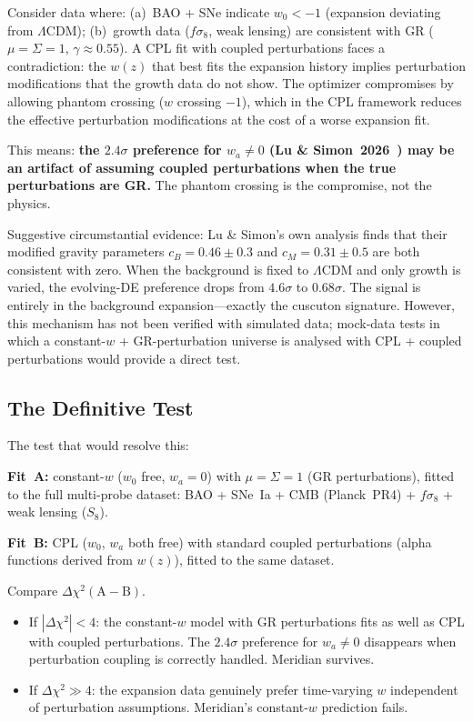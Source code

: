 Consider data where: (a)~BAO + SNe indicate $w_0 < -1$ (expansion deviating from $\Lambda$CDM); (b)~growth data ($f\sigma_8$, weak lensing) are consistent with GR ($\mu = \Sigma = 1$, $\gamma \approx 0.55$). A CPL fit with coupled perturbations faces a contradiction: the $w(z)$ that best fits the expansion history implies perturbation modifications that the growth data do not show. The optimizer compromises by allowing phantom crossing ($w$ crossing $-1$), which in the CPL framework reduces the effective perturbation modifications at the cost of a worse expansion fit.

This means: \textbf{the $2.4\sigma$ preference for $w_a \neq 0$ (Lu \& Simon~2026~\cite{ch2:LuSimon2026}) may be an artifact of assuming coupled perturbations when the true perturbations are GR.} The phantom crossing is the compromise, not the physics.

Suggestive circumstantial evidence: Lu \& Simon's own analysis finds that their modified gravity parameters $c_B = 0.46 \pm 0.3$ and $c_M = 0.31 \pm 0.5$ are both consistent with zero. When the background is fixed to $\Lambda$CDM and only growth is varied, the evolving-DE preference drops from $4.6\sigma$ to $0.68\sigma$. The signal is entirely in the background expansion---exactly the cuscuton signature. However, this mechanism has not been verified with simulated data; mock-data tests in which a constant-$w$ + GR-perturbation universe is analysed with CPL + coupled perturbations would provide a direct test.

\subsection{The Definitive Test}
\label{sec:2-decoupled-test}

The test that would resolve this:

\textbf{Fit~A:} constant-$w$ ($w_0$ free, $w_a = 0$) with $\mu = \Sigma = 1$ (GR perturbations), fitted to the full multi-probe dataset: BAO + SNe~Ia + CMB (Planck~PR4) + $f\sigma_8$ + weak lensing ($S_8$).

\textbf{Fit~B:} CPL ($w_0$, $w_a$ both free) with standard coupled perturbations (alpha functions derived from $w(z)$), fitted to the same dataset.

Compare $\Delta\chi^2(\mathrm{A} - \mathrm{B})$.

\begin{itemize}
\item If $|\Delta\chi^2| < 4$: the constant-$w$ model with GR perturbations fits as well as CPL with coupled perturbations. The $2.4\sigma$ preference for $w_a \neq 0$ disappears when perturbation coupling is correctly handled. Meridian survives.
\item If $\Delta\chi^2 \gg 4$: the expansion data genuinely prefer time-varying $w$ independent of perturbation assumptions. Meridian's constant-$w$ prediction fails.
\end{itemize}


